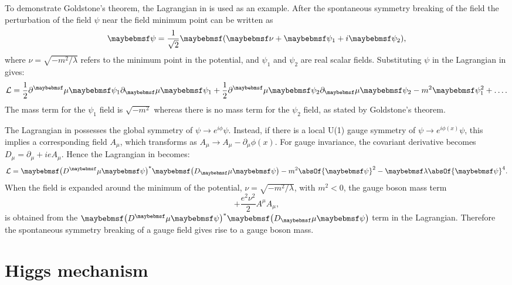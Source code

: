 To demonstrate Goldstone's theorem, the Lagrangian in  is used as an example. After the spontaneous symmetry breaking of the field the perturbation of the field $\psi$ near the field minimum point can be written as
 \begin{equation}
\psi = \frac{1}{\sqrt{2}}\parenths{\nu+\psi_1+i\psi_2},
\end{equation}
where $\nu=\sqrt{{-m^2}/{\lambda}}$ refers to the minimum point in the potential, and $\psi_1$ and $\psi_2$ are real scalar fields. Substituting $\psi$ in the Lagrangian in  gives:
\begin{equation}
\Lagr = \frac{1}{2}\partial^\mu{\psi_1}\partial_\mu\psi_1 + \frac{1}{2}\partial^\mu{\psi_2}\partial_\mu\psi_2 - m^2 \psi_1^2 + \hdots.
\end{equation}
The mass term for the $\psi_1$ field is $\sqrt{-m^2}$ whereas there is no mass term for the $\psi_2$ field, as stated by Goldstone's theorem.

The Lagrangian in  possesses  the global symmetry of $\psi \to e^{i\phi}\psi$. Instead, if there is a local U(1) gauge symmetry of  $\psi \to e^{i\phi(x)}\psi$, this implies a corresponding field $A_{\mu}$, which transforms as $A_\mu \to A_\mu - \partial_\mu\phi(x)$. For gauge invariance, the covariant derivative becomes $D_\mu = \partial_\mu+ieA_\mu$. Hence the Lagrangian in  becomes:
\begin{equation}
\Lagr = \parenths{D^\mu{\psi}}^*\parenths{D_\mu\psi} - m^2 \absOf{\psi}^2    - \lambda\absOf{\psi}^4.
\end{equation}
When the field is expanded around the minimum of the potential,  $\nu=\sqrt{{-m^2}/{\lambda}}$, with $m^2<0$,  the gauge boson mass term
\begin{equation}
+\frac{e^2\nu^2}{2}A^\mu{A}_\mu,
\end{equation}
 is obtained from the $\parenths{D^\mu{\psi}}^*\parenths{D_\mu\psi} $ term in the Lagrangian. Therefore the spontaneous symmetry breaking of a gauge field gives rise to a gauge boson mass.

\section{Higgs mechanism}
\label{sec:theoryHiggs}

